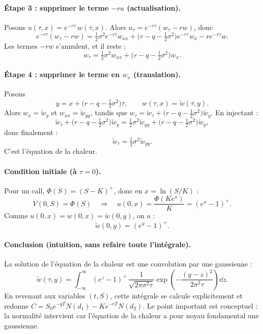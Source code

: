 \paragraph{Étape 3 : supprimer le terme $-ru$ (actualisation).}
Posons $u(\tau,x)=e^{-r\tau}\,w(\tau,x)$. Alors
$u_\tau=e^{-r\tau}(w_\tau-rw)$, donc
\[
e^{-r\tau}(w_\tau-rw)=\tfrac12\sigma^2 e^{-r\tau}w_{xx}+\Big(r-q-\tfrac12\sigma^2\Big)e^{-r\tau}w_x-r e^{-r\tau}w.
\]
Les termes $-rw$ s'annulent, et il reste :
\[
w_\tau=\tfrac12\sigma^2 w_{xx}+\Big(r-q-\tfrac12\sigma^2\Big)w_x.
\]

\paragraph{Étape 4 : supprimer le terme en $w_x$ (translation).}
Posons
\[
y=x+\Big(r-q-\tfrac12\sigma^2\Big)\tau,
\qquad
w(\tau,x)=\widetilde w(\tau,y).
\]
Alors $w_x=\widetilde w_y$ et $w_{xx}=\widetilde w_{yy}$, tandis que
$w_\tau=\widetilde w_\tau+\Big(r-q-\tfrac12\sigma^2\Big)\widetilde w_y$.
En injectant :
\[
\widetilde w_\tau+\Big(r-q-\tfrac12\sigma^2\Big)\widetilde w_y
=\tfrac12\sigma^2\widetilde w_{yy}+\Big(r-q-\tfrac12\sigma^2\Big)\widetilde w_y,
\]
donc finalement :
\[
\boxed{\widetilde w_\tau=\tfrac12\sigma^2\widetilde w_{yy}.}
\]
C'est l'équation de la chaleur.

\paragraph{Condition initiale (à $\tau=0$).}
Pour un call, $\Phi(S)=(S-K)^+$, donc en $x=\ln(S/K)$ :
\[
V(0,S)=\Phi(S)\quad\Rightarrow\quad u(0,x)=\frac{\Phi(Ke^x)}{K}=(e^x-1)^+.
\]
Comme $u(0,x)=w(0,x)=\widetilde w(0,y)$, on a :
\[
\widetilde w(0,y)=(e^y-1)^+.
\]

\paragraph{Conclusion (intuition, sans refaire toute l'intégrale).}
La solution de l'équation de la chaleur est une convolution par une gaussienne :
\[
\widetilde w(\tau,y)=\int_{-\infty}^{\infty} (e^z-1)^+\,
\frac{1}{\sqrt{2\pi\sigma^2\tau}}\exp\!\left(-\frac{(y-z)^2}{2\sigma^2\tau}\right)\dd z.
\]
En revenant aux variables $(t,S)$, cette intégrale se calcule explicitement et redonne
$C=S_0e^{-qT}N(d_1)-Ke^{-rT}N(d_2)$.
Le point important est conceptuel : la normalité intervient car l'équation de la chaleur a pour noyau fondamental une gaussienne.
